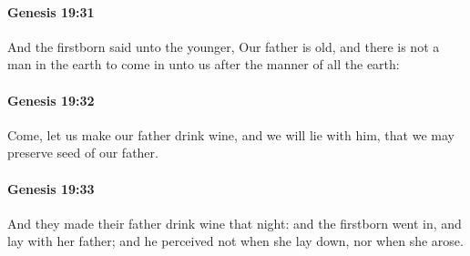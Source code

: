 		\paragraph{Genesis 19:31} %
			\label{GENESIS-19-31}

			And the firstborn said unto the younger, Our father is old, and there is not a man in the earth to come in unto us after the manner of all the earth:


		\paragraph{Genesis 19:32} %
			\label{GENESIS-19-32}

			Come, let us make our father drink wine, and we will lie with him, that we may preserve seed of our father.


		\paragraph{Genesis 19:33} %
			\label{GENESIS-19-33}

			And they made their father drink wine that night: and the firstborn went in, and lay with her father; and he perceived not when she lay down, nor when she arose.


